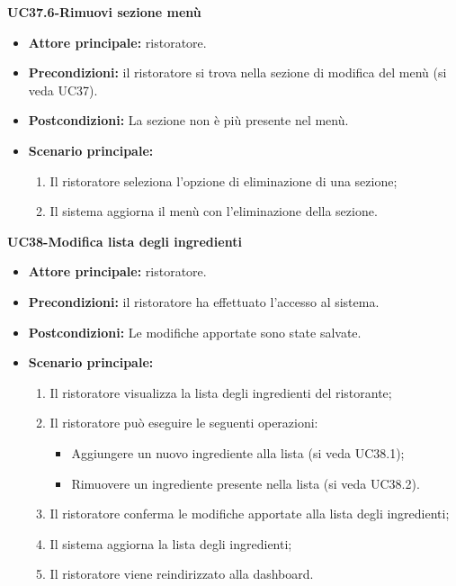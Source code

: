 \textbf{UC37.6-Rimuovi sezione menù}  
\begin{itemize}
    \item \textbf{Attore principale:} ristoratore.
    \item \textbf{Precondizioni:} il ristoratore si trova nella sezione di modifica del menù (si veda UC37).
    \item \textbf{Postcondizioni:} La sezione non è più presente nel menù.
    \item \textbf{Scenario principale:}
    \begin{enumerate}
        \item Il ristoratore seleziona l'opzione di eliminazione di una sezione;
        \item Il sistema aggiorna il menù con l'eliminazione della sezione.
    \end{enumerate}
\end{itemize}


\textbf{UC38-Modifica lista degli ingredienti}  
\begin{itemize}
    \item \textbf{Attore principale:} ristoratore.
    \item \textbf{Precondizioni:} il ristoratore ha effettuato l'accesso al sistema.
    \item \textbf{Postcondizioni:} Le modifiche apportate sono state salvate.
    \item \textbf{Scenario principale:}
    \begin{enumerate}
        \item Il ristoratore visualizza la lista degli ingredienti del ristorante;
        \item Il ristoratore può eseguire le seguenti operazioni:
        \begin{itemize}
           \item Aggiungere un nuovo ingrediente alla lista (si veda UC38.1);
           \item Rimuovere un ingrediente presente nella lista (si veda UC38.2).
        \end{itemize}
    \item Il ristoratore conferma le modifiche apportate alla lista degli ingredienti;
    \item Il sistema aggiorna la lista degli ingredienti;
    \item Il ristoratore viene reindirizzato alla dashboard.
    \end{enumerate}
\end{itemize}

